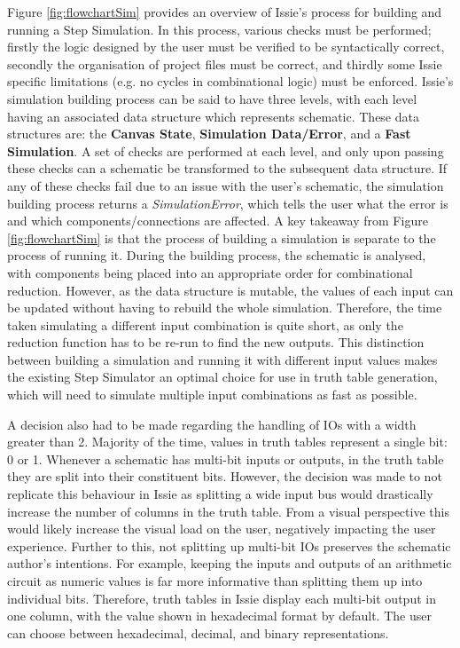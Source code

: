 Figure \ref{fig:flowchartSim} provides an overview of Issie's process for building and running a Step Simulation. In this process, various checks must be performed; firstly the logic designed by the user must be verified to be syntactically correct, secondly the organisation of project files must be correct, and thirdly some Issie specific limitations (e.g. no cycles in combinational logic) must be enforced. Issie's simulation building process can be said to have three levels, with each level having an associated data structure which represents schematic. These data structures are: the \textbf{Canvas State}, \textbf{Simulation Data/Error}, and a \textbf{Fast Simulation}. A set of checks are performed at each level, and only upon passing these checks can a schematic be transformed to the subsequent data structure.
If any of these checks fail due to an issue with the user's schematic, the simulation building process returns a \textit{SimulationError}, which tells the user what the error is and which components/connections are affected. A key takeaway from Figure \ref{fig:flowchartSim} is that the process of building a simulation is separate to the process of running it. During the  building process, the schematic is analysed, with components being placed into an appropriate order for combinational reduction. However, as the  data structure is mutable, the values of each input can be updated without having to rebuild the whole simulation. Therefore, the time taken simulating a different input combination is quite short, as only the reduction function has to be re-run to find the new outputs. 
This distinction between building a simulation and running it with different input values makes the existing Step Simulator an optimal choice for use in truth table generation, which will need to simulate multiple input combinations as fast as possible. 

A decision also had to be made regarding the handling of IOs with a width greater than 2. Majority of the time, values in truth tables represent a single bit: 0 or 1. Whenever a schematic has multi-bit inputs or outputs, in the truth table they are split into their constituent bits. However, the decision was made to not replicate this behaviour in Issie as splitting a wide input bus would drastically increase the number of columns in the truth table. From a visual perspective this would likely increase the visual load on the user, negatively impacting the user experience. Further to this, not splitting up multi-bit IOs preserves the schematic author's intentions. For example, keeping the inputs and outputs of an arithmetic circuit as numeric values is far more informative than splitting them up into individual bits. Therefore, truth tables in Issie display each multi-bit output in one column, with the value shown in hexadecimal format by default. The user can choose between hexadecimal, decimal, and binary representations.

